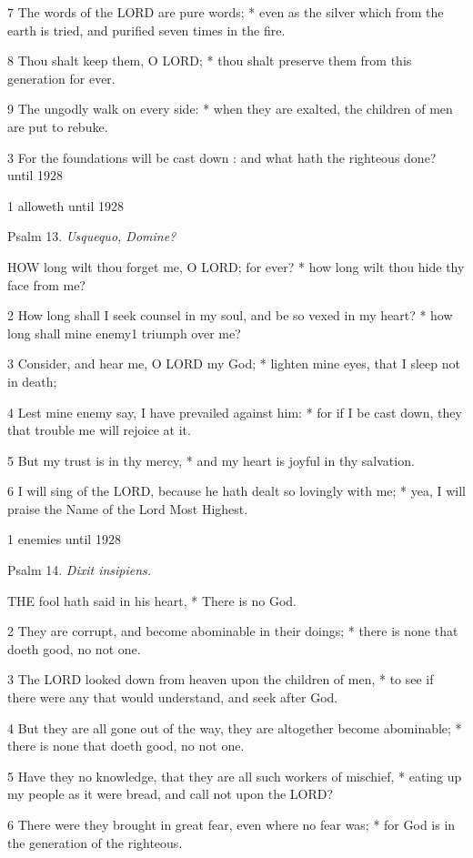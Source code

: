 7 The words of the LORD are pure words; * even
as the silver which from the earth is tried, and purified seven times
in the fire.

8 Thou shalt keep them, O LORD; * thou shalt preserve
them from this generation for ever.

9 The ungodly walk on every side: * when they are exalted, the children
of men are put to rebuke.

3 For the foundations will be cast
down : and what hath the righteous done? until
1928

1 alloweth until
1928

Psalm
13. \emph{Usquequo, Domine?}

HOW
long wilt thou forget me, O LORD; for ever? * how
long wilt thou hide thy face from me?

2 How long shall I seek counsel in my soul, and be
so vexed in my heart? * how long shall mine enemy1 triumph
over me?

3 Consider, and hear me, O LORD
my God; * lighten mine eyes, that I sleep not in death;

4 Lest mine enemy say, I have prevailed against him:
* for if I be cast down, they that trouble me will rejoice at it.

5 But my trust is in thy mercy, * and my heart is joyful
in thy salvation.

6 I will sing of the LORD, because
he hath dealt so lovingly with me; * yea, I will praise the Name of the
Lord Most Highest.

1 enemies until
1928

Psalm
14. \emph{Dixit insipiens.}

THE
fool hath said in his heart, * There is no God.

2 They are corrupt, and become abominable in their doings; * there is
none that doeth good, no not one.

3 The LORD looked down from
heaven upon the children of men, * to see if there were any that would
understand, and seek after God.

4 But they are all gone out of the way, they are altogether
become abominable; * there is none that doeth good, no not one.

5 Have they no knowledge, that they are all such workers
of mischief, * eating up my people as it were bread, and call not upon
the LORD?

6 There were they brought in great fear, even where
no fear was; * for God is in the generation of the righteous.

